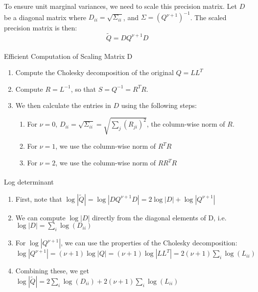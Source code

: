 \documentclass[
  letterpaper,
  DIV=11,
  numbers=noendperiod]{scrartcl}
\makeatletter
\let\oldparagraph\paragraph
\renewcommand{\paragraph}{
    \@ifstar
      \xxxParagraphStar
      \xxxParagraphNoStar
  }
\newcommand{\xxxParagraphStar}[1]{\oldparagraph*{#1}\mbox{}}
\newcommand{\xxxParagraphNoStar}[1]{\oldparagraph{#1}\mbox{}}
\providecommand{\tightlist}{%
  \setlength{\itemsep}{0pt}\setlength{\parskip}{0pt}}\usepackage{longtable,booktabs,array}
\makeatother
\begin{document}
To ensure unit marginal variances, we need to scale this precision
matrix. Let \(D\) be a diagonal matrix where
\(D_{ii} = \sqrt{\Sigma_{ii}}\), and \(\Sigma = (Q^{\nu+1})^{-1}\). The
scaled precision matrix is then: \[
\tilde{Q} = DQ^{\nu+1}D
\]

\paragraph{Efficient Computation of Scaling Matrix
D}\label{efficient-computation-of-scaling-matrix-d}

\begin{enumerate}
\def\labelenumi{\arabic{enumi}.}
\tightlist
\item
  Compute the Cholesky decomposition of the original \(Q = LL^T\)
\item
  Compute \(R = L^{-1}\), so that \(S = Q^{-1} = R^TR\).
\item
  We then calculate the entries in \(D\) using the following steps:

  \begin{enumerate}
  \def\labelenumii{\roman{enumii}.}
  \tightlist
  \item
    For \(\nu = 0\),
    \(D_{ii} = \sqrt{\Sigma_{ii}} = \sqrt{\sum_j (R_{ji})^2}\), the
    column-wise norm of \(R\).
  \item
    For \(\nu = 1\), we use the column-wise norm of \(R^TR\)
  \item
    For \(\nu = 2\), we use the column-wise norm of \(RR^TR\)
  \end{enumerate}
\end{enumerate}

\paragraph{Log determinant}\label{log-determinant}

\begin{enumerate}
\def\labelenumi{\arabic{enumi}.}
\tightlist
\item
  First, note that
  \(\log|\tilde{Q}| = \log|DQ^{\nu+1}D| = 2\log|D| + \log|Q^{\nu+1}|\)
\item
  We can compute \(\log|D|\) directly from the diagonal elements of D,
  i.e.~\(\log|D| = \sum_i \log(D_{ii})\)
\item
  For \(\log|Q^{\nu+1}|\), we can use the properties of the Cholesky
  decomposition:
  \(\log|Q^{\nu+1}| = (\nu+1)\log|Q| = (\nu+1)\log|LL^T| = 2(\nu+1)\sum_i \log(L_{ii})\)
\item
  Combining these, we get
  \(\log|\tilde{Q}| = 2\sum_i \log(D_{ii}) + 2(\nu+1)\sum_i \log(L_{ii})\)
\end{enumerate}
\end{document}
